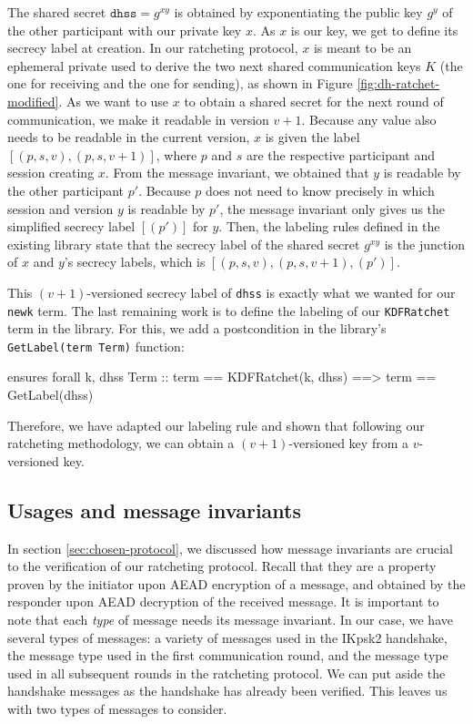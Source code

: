 The shared secret $\texttt{dhss} = g^{xy}$ is obtained by exponentiating the public key $g^y$ of the other participant with our private key $x$.
As $x$ is our key, we get to define its secrecy label at creation. 
In our ratcheting protocol, $x$ is meant to be an ephemeral private used to derive the two next shared communication keys $K$ (the one for receiving and the one for sending), as shown in Figure \ref{fig:dh-ratchet-modified}.
As we want to use $x$ to obtain a shared secret for the next round of communication, we make it readable in version $v+1$. Because any value also needs to be readable in the current version, $x$ is given the label $[(p,s,v),(p,s,v+1)]$, where $p$ and $s$ are the respective participant and session creating $x$.
From the message invariant, we obtained that $y$ is readable by the other participant $p'$. Because $p$ does not need to know precisely in which session and version $y$ is readable by $p'$, the message invariant only gives us the simplified secrecy label $[(p')]$ for $y$.
Then, the labeling rules defined in the existing library state that the secrecy label of the shared secret $g^{xy}$ is the junction of $x$ and $y$'s secrecy labels, which is $[(p,s,v),(p,s,v+1),(p')]$.

This $(v+1)$-versioned secrecy label of \texttt{dhss} is exactly what we wanted for our \texttt{newk} term.
The last remaining work is to define the labeling of our \texttt{KDFRatchet} term in the library. 
For this, we add a postcondition in the library's \texttt{GetLabel(term Term)} function:
\begin{gobra}
ensures forall k, dhss Term ::
    term == KDFRatchet(k, dhss) ==> term == GetLabel(dhss)
\end{gobra}
Therefore, we have adapted our labeling rule and shown that following our ratcheting methodology, we can obtain a $(v+1)$-versioned key from a $v$-versioned key.

\subsection{Usages and message invariants}
\label{sec:usages-and-message-invariants}

In section \ref{sec:chosen-protocol}, we discussed how message invariants are crucial to the verification of our ratcheting protocol.
Recall that they are a property proven by the initiator upon AEAD encryption of a message, and obtained by the responder upon AEAD decryption of the received message.
It is important to note that each \emph{type} of message needs its message invariant.
In our case, we have several types of messages: a variety of messages used in the IKpsk2 handshake, the message type used in the first communication round, and the message type used in all subsequent rounds in the ratcheting protocol.
We can put aside the handshake messages as the handshake has already been verified.
This leaves us with two types of messages to consider.

